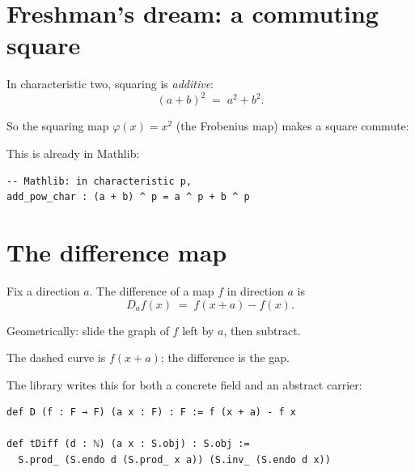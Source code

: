 \documentclass[11pt]{article}
\begin{document}
\section{Freshman's dream: a commuting square}

In characteristic two, squaring is \emph{additive}:
\[
  (a+b)^2 \;=\; a^2 + b^2 .
\]

So the squaring map $\varphi(x)=x^2$ (the Frobenius map) makes a square commute:

\begin{center}
\end{center}

This is already in Mathlib:

\begin{lstlisting}
-- Mathlib: in characteristic p,
add_pow_char : (a + b) ^ p = a ^ p + b ^ p
\end{lstlisting}

\section{The difference map}

Fix a direction $a$.  The difference of a map $f$ in direction $a$ is
\[
  D_a f(x) \;=\; f(x+a) - f(x) .
\]

Geometrically: slide the graph of $f$ left by $a$, then subtract.

\begin{center}

{\small The dashed curve is $f(x+a)$; the difference is the gap.}
\end{center}

The library writes this for both a concrete field and an abstract carrier:

\begin{lstlisting}
def D (f : F → F) (a x : F) : F := f (x + a) - f x

def tDiff (d : ℕ) (a x : S.obj) : S.obj :=
  S.prod_ (S.endo d (S.prod_ x a)) (S.inv_ (S.endo d x))
\end{lstlisting}
\end{document}
